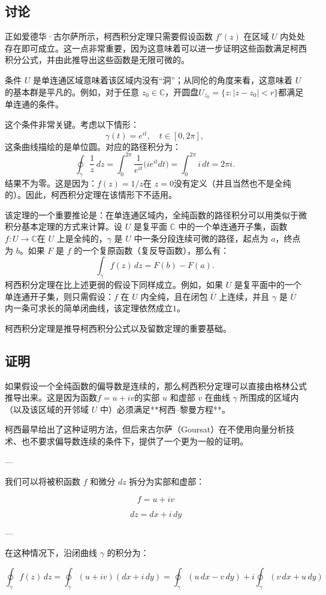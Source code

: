 \subsection{讨论}
正如爱德华·古尔萨所示，柯西积分定理只需要假设函数 $f'(z)$ 在区域 $U$ 内处处存在即可成立。这一点非常重要，因为这意味着可以进一步证明这些函数满足柯西积分公式，并由此推导出这些函数是无限可微的。

条件 $U$ 是单连通区域意味着该区域内没有“洞”；从同伦的角度来看，这意味着 $U$ 的基本群是平凡的。例如，对于任意 $z_0 \in \mathbb{C}$，开圆盘$U_{z_0} = \{z : |z - z_0| < r \}$都满足单连通的条件。

这个条件非常关键。考虑以下情形：
$$
\gamma(t) = e^{it}, \quad t \in [0, 2\pi],~
$$
这条曲线描绘的是单位圆。对应的路径积分为：
$$
\oint_{\gamma} \frac{1}{z}\,dz
= \int_0^{2\pi} \frac{1}{e^{it}} \big(i e^{it} dt\big)
= \int_0^{2\pi} i\, dt
= 2\pi i.~
$$
结果不为零。这是因为：$f(z) = 1/z$在 $z = 0$没有定义（并且当然也不是全纯的）。因此，柯西积分定理在该情形下不适用。

该定理的一个重要推论是：在单连通区域内，全纯函数的路径积分可以用类似于微积分基本定理的方式来计算。设 $U$ 是复平面 $\mathbb{C}$ 中的一个单连通开子集，函数$f: U \to \mathbb{C}$在 $U$ 上是全纯的，$\gamma$ 是 $U$ 中一条分段连续可微的路径，起点为 $a$，终点为 $b$。如果 $F$ 是 $f$ 的一个复原函数（复反导函数），那么有：
$$
\int_{\gamma} f(z)\,dz = F(b) - F(a).~
$$
柯西积分定理在比上述更弱的假设下同样成立。例如，如果 $U$ 是复平面中的一个单连通开子集，则只需假设：$f$ 在 $U$ 内全纯，且在闭包 $\overline{U}$ 上连续，并且 $\gamma$ 是 $\overline{U}$ 内一条可求长的简单闭曲线，该定理依然成立$1$。

柯西积分定理是推导柯西积分公式以及留数定理的重要基础。
\subsection{证明}
如果假设一个全纯函数的偏导数是连续的，那么柯西积分定理可以直接由格林公式推导出来。这是因为函数$f = u + iv$的实部 $u$ 和虚部 $v$ 在曲线 $\gamma$ 所围成的区域内（以及该区域的开邻域 $U$ 中）必须满足**柯西–黎曼方程**。

柯西最早给出了这种证明方法，但后来古尔萨（Goursat）在不使用向量分析技术、也不要求偏导数连续的条件下，提供了一个更为一般的证明。

---

我们可以将被积函数 $f$ 和微分 $dz$ 拆分为实部和虚部：

$$
f = u + iv
$$

$$
dz = dx + i\,dy
$$

---

在这种情况下，沿闭曲线 $\gamma$ 的积分为：

$$
\oint_{\gamma} f(z)\,dz
= \oint_{\gamma} (u + iv)(dx + i\,dy)
= \oint_{\gamma} (u\,dx - v\,dy)
+ i \oint_{\gamma} (v\,dx + u\,dy)
$$
